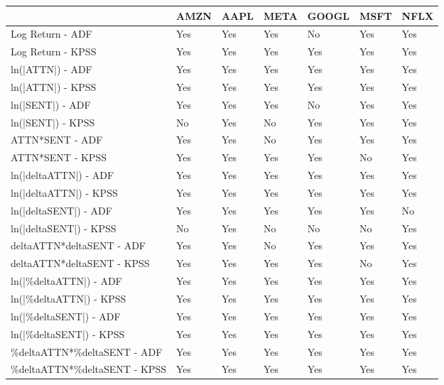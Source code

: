 \begin{tabular}{lllllll}
\toprule
{} & AMZN & AAPL & META & GOOGL & MSFT & NFLX \\
\midrule
Log Return - ADF             &  Yes &  Yes &  Yes &    No &  Yes &  Yes \\
Log Return - KPSS            &  Yes &  Yes &  Yes &   Yes &  Yes &  Yes \\
ln(|ATTN|) - ADF             &  Yes &  Yes &  Yes &   Yes &  Yes &  Yes \\
ln(|ATTN|) - KPSS            &  Yes &  Yes &  Yes &   Yes &  Yes &  Yes \\
ln(|SENT|) - ADF             &  Yes &  Yes &  Yes &    No &  Yes &  Yes \\
ln(|SENT|) - KPSS            &   No &  Yes &   No &   Yes &  Yes &  Yes \\
ATTN*SENT - ADF              &  Yes &  Yes &   No &   Yes &  Yes &  Yes \\
ATTN*SENT - KPSS             &  Yes &  Yes &  Yes &   Yes &   No &  Yes \\
ln(|deltaATTN|) - ADF        &  Yes &  Yes &  Yes &   Yes &  Yes &  Yes \\
ln(|deltaATTN|) - KPSS       &  Yes &  Yes &  Yes &   Yes &  Yes &  Yes \\
ln(|deltaSENT|) - ADF        &  Yes &  Yes &  Yes &   Yes &  Yes &   No \\
ln(|deltaSENT|) - KPSS       &   No &  Yes &   No &    No &   No &  Yes \\
deltaATTN*deltaSENT - ADF    &  Yes &  Yes &   No &   Yes &  Yes &  Yes \\
deltaATTN*deltaSENT - KPSS   &  Yes &  Yes &  Yes &   Yes &   No &  Yes \\
ln(|\%deltaATTN|) - ADF       &  Yes &  Yes &  Yes &   Yes &  Yes &  Yes \\
ln(|\%deltaATTN|) - KPSS      &  Yes &  Yes &  Yes &   Yes &  Yes &  Yes \\
ln(|\%deltaSENT|) - ADF       &  Yes &  Yes &  Yes &   Yes &  Yes &  Yes \\
ln(|\%deltaSENT|) - KPSS      &  Yes &  Yes &  Yes &   Yes &  Yes &  Yes \\
\%deltaATTN*\%deltaSENT - ADF  &  Yes &  Yes &  Yes &   Yes &  Yes &  Yes \\
\%deltaATTN*\%deltaSENT - KPSS &  Yes &  Yes &  Yes &   Yes &  Yes &  Yes \\
\bottomrule
\end{tabular}
